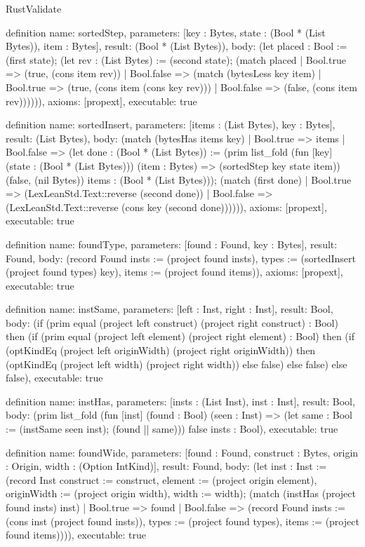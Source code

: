 \begin{lexlean}{RustValidate}
\begin{semanticmodule}
definition{
  name: sortedStep,
  parameters: [key : Bytes, state : (Bool * (List Bytes)), item : Bytes],
  result: (Bool * (List Bytes)),
  body: (let placed : Bool := (first state); (let rev : (List Bytes) := (second state); (match placed
    | Bool.true => (true, (cons item rev))
    | Bool.false => (match (bytesLess key item)
      | Bool.true => (true, (cons item (cons key rev)))
      | Bool.false => (false, (cons item rev)))))),
  axioms: [propext],
  executable: true
}

definition{
  name: sortedInsert,
  parameters: [items : (List Bytes), key : Bytes],
  result: (List Bytes),
  body: (match (bytesHas items key)
    | Bool.true => items
    | Bool.false => (let done : (Bool * (List Bytes)) := (prim list_fold (fun [key] (state : (Bool * (List Bytes))) (item : Bytes) => (sortedStep key state item)) (false, (nil Bytes)) items : (Bool * (List Bytes))); (match (first done)
      | Bool.true => (LexLeanStd.Text::reverse (second done))
      | Bool.false => (LexLeanStd.Text::reverse (cons key (second done)))))),
  axioms: [propext],
  executable: true
}

definition{
  name: foundType,
  parameters: [found : Found, key : Bytes],
  result: Found,
  body: (record Found {insts := (project found insts), types := (sortedInsert (project found types) key), items := (project found items)}),
  axioms: [propext],
  executable: true
}

definition{
  name: instSame,
  parameters: [left : Inst, right : Inst],
  result: Bool,
  body: (if (prim equal (project left construct) (project right construct) : Bool) then (if (prim equal (project left element) (project right element) : Bool) then (if (optKindEq (project left originWidth) (project right originWidth)) then (optKindEq (project left width) (project right width)) else false) else false) else false),
  executable: true
}

definition{
  name: instHas,
  parameters: [insts : (List Inst), inst : Inst],
  result: Bool,
  body: (prim list_fold (fun [inst] (found : Bool) (seen : Inst) => (let same : Bool := (instSame seen inst); (found || same))) false insts : Bool),
  executable: true
}

definition{
  name: foundWide,
  parameters: [found : Found, construct : Bytes, origin : Origin, width : (Option IntKind)],
  result: Found,
  body: (let inst : Inst := (record Inst {construct := construct, element := (project origin element), originWidth := (project origin width), width := width}); (match (instHas (project found insts) inst)
    | Bool.true => found
    | Bool.false => (record Found {insts := (cons inst (project found insts)), types := (project found types), items := (project found items)}))),
  executable: true
}


\end{semanticmodule}
\end{lexlean}

